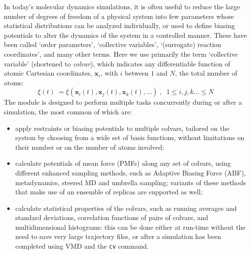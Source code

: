 In today's molecular dynamics simulations, it is often useful to reduce the large number of degrees of freedom of a physical system into few parameters whose statistical distributions can be analyzed individually, or used to define biasing potentials to alter the dynamics of the system in a controlled manner. 
These have been called `order parameters', `collective variables', `(surrogate) reaction coordinates', and many other terms.
Here we use primarily the term `collective variable' (shortened to \textit{colvar}), which indicates any differentiable function of atomic Cartesian coordinates, $\bm{x}_{i}$, with $i$ between $1$ and $N$, the total
number of atoms:
\begin{equation} 
  \label{eq:colvar_basic}
  \xi(t) \; = \xi\left(\bm{x}_{i}(t), \bm{x}_{j}(t), \bm{x}_{k}(t),
  \ldots \right)\;, \;\; 1 \leq i,j,k\ldots \leq N
\end{equation}
The module is designed to perform multiple tasks concurrently during or after a simulation, the most common of which are:
\begin{itemize}

\item apply restraints or biasing potentials to multiple colvars, tailored on the system by choosing from a wide set of basis functions, without limitations on their number or on the number of atoms involved; 

\item calculate potentials of mean force (PMFs) along any set of colvars, using different enhanced sampling methods, such as Adaptive Biasing Force (ABF), metadynamics, steered MD and umbrella sampling; variants of these methods that make use of an ensemble of replicas are supported as well;

\item calculate statistical properties of the colvars, such as running averages and standard deviations, correlation functions of pairs of colvars, and multidimensional histograms: this can be done either at run-time without the need to save very large trajectory files, or after a simulation has been completed using VMD and the \texttt{cv} command.

\end{itemize}

